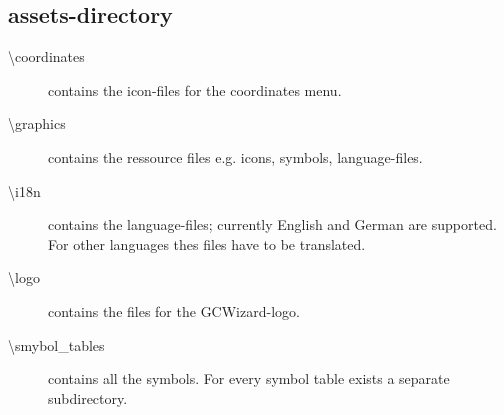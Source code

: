 \subsection{assets-directory}
\label{fig: structure-assets}

\begin{description}
    \item[\textbackslash coordinates] contains the icon-files for the coordinates menu.
    \item[\textbackslash graphics] contains the ressource files e.g. icons, symbols, language-files.
    \item[\textbackslash i18n] contains the language-files; currently English and German are supported. For other languages thes files have to be translated.
    \item[\textbackslash logo] contains the files for the GCWizard-logo.
    \item[\textbackslash smybol\_tables] contains all the symbols. For every symbol table exists a separate subdirectory.
\end{description}

